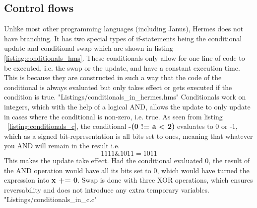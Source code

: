 \subsection{Control flows}
Unlike most other programming languages (including Janus), Hermes does not have branching. It has two special types of if-statements being the conditional update and conditional swap which are shown in listing \ref{listing:conditionals_hms}. These conditionals only allow for one line of code to be executed, i.e. the swap or the update, and have a constant execution time. This is because they are constructed in such a way that the code of the conditional is always evaluated but only takes effect or gets executed if the condition is true.
 {"Listings/conditionals_in_hermes.hms"}
Conditionals work on integers, which with the help of a logical AND, allows the update to only update in cases where the conditional is non-zero, i.e. true. As seen from listing ~\ref{listing:conditionals_c}, the conditional \textbf{-(0 != a < 2)} evaluates to 0 or -1, which as a signed bit-representation is all bits set to ones, meaning that whatever you AND will remain in the result i.e.
\begin{equation*}
  1111 \& 1011 = 1011
\end{equation*}
This makes the update take effect. Had the conditional evaluated 0, the result of the AND operation would have all its bits set to 0, which would have turned the expression into \textbf{x += 0}.
Swap is done with three XOR operations, which ensures reversability and does not introduce any extra temporary variables.
 {"Listings/conditionals_in_c.c"}


